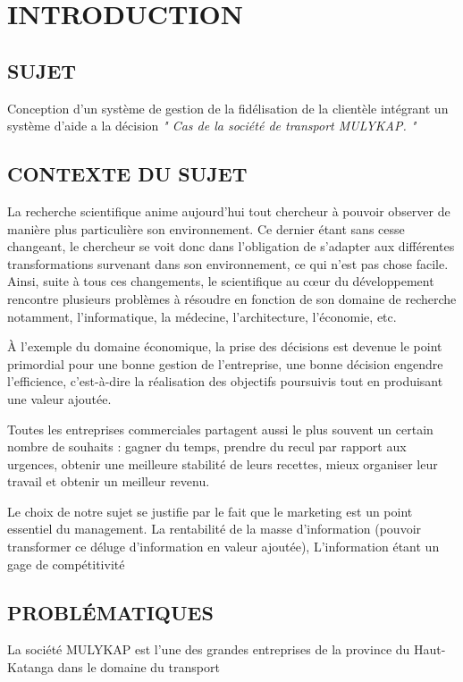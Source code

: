 \documentclass[a4paper,12pt,oneside]{book}
\begin{document}
\chapter*{INTRODUCTION}
\section[Sujet]{SUJET}
Conception d’un système de gestion de la fidélisation
de la clientèle intégrant un système d’aide a la décision 
\textit{" Cas de la société de transport MULYKAP. "}
\section[Context du sujet]{CONTEXTE DU SUJET}
La recherche scientifique anime aujourd’hui tout chercheur 
à pouvoir observer de manière
plus particulière son environnement. Ce dernier étant 
sans cesse changeant, le chercheur se voit donc
dans l’obligation de s’adapter aux différentes transformations
survenant dans son environnement, ce qui n’est pas chose facile.
Ainsi, suite à tous ces changements, le scientifique au cœur du
développement rencontre plusieurs problèmes à résoudre en 
fonction de son domaine de recherche notamment, l’informatique,
la médecine, l’architecture, l’économie, etc.
\newline

À l’exemple du domaine
économique, la prise des décisions est devenue
le point primordial pour une bonne gestion de
l’entreprise, une bonne décision engendre l’efficience,
c’est-à-dire la réalisation des objectifs
poursuivis tout en produisant une valeur ajoutée.
\newline

Toutes les entreprises commerciales partagent aussi
le plus souvent un certain nombre de souhaits : gagner
du temps, prendre du recul par rapport aux urgences, obtenir une meilleure
stabilité de leurs recettes, mieux organiser leur travail et obtenir un meilleur
revenu. \cite*{Barouch2010}
\newline

Le choix de notre sujet se justifie par le fait que le marketing 
est un point essentiel du management.
La rentabilité de la masse d’information (pouvoir transformer
ce déluge d’information en valeur ajoutée), L’information étant
un gage de compétitivité %

\section[Problématique]{PROBLÉMATIQUES}
La société MULYKAP est l’une des grandes entreprises
de la province du Haut-Katanga dans le domaine du transport
\end{document}
